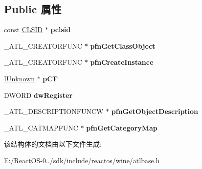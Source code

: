 \subsection*{Public 属性}
\begin{DoxyCompactItemize}
\item 
\mbox{\label{struct___a_t_l___o_b_j_m_a_p___e_n_t_r_y_w___t_a_g_adda3adce478095addcf8addf1cc44a13}} 
const \hyperlink{struct___i_i_d}{C\+L\+S\+ID} $\ast$ {\bfseries pclsid}
\item 
\mbox{\label{struct___a_t_l___o_b_j_m_a_p___e_n_t_r_y_w___t_a_g_ae605e66cee32ff31ecbcecfc16b94a3b}} 
\+\_\+\+A\+T\+L\+\_\+\+C\+R\+E\+A\+T\+O\+R\+F\+U\+NC $\ast$ {\bfseries pfn\+Get\+Class\+Object}
\item 
\mbox{\label{struct___a_t_l___o_b_j_m_a_p___e_n_t_r_y_w___t_a_g_a1512e658660d43cb823254295458a99a}} 
\+\_\+\+A\+T\+L\+\_\+\+C\+R\+E\+A\+T\+O\+R\+F\+U\+NC $\ast$ {\bfseries pfn\+Create\+Instance}
\item 
\mbox{\label{struct___a_t_l___o_b_j_m_a_p___e_n_t_r_y_w___t_a_g_a3004e0c7b805eb277e467aecdd915f16}} 
\hyperlink{interface_i_unknown}{I\+Unknown} $\ast$ {\bfseries p\+CF}
\item 
\mbox{\label{struct___a_t_l___o_b_j_m_a_p___e_n_t_r_y_w___t_a_g_afc8fbf310be7343497c9de46264fcede}} 
D\+W\+O\+RD {\bfseries dw\+Register}
\item 
\mbox{\label{struct___a_t_l___o_b_j_m_a_p___e_n_t_r_y_w___t_a_g_a39dbcde174a44d03d6dd3d8247fd3d19}} 
\+\_\+\+A\+T\+L\+\_\+\+D\+E\+S\+C\+R\+I\+P\+T\+I\+O\+N\+F\+U\+N\+CW $\ast$ {\bfseries pfn\+Get\+Object\+Description}
\item 
\mbox{\label{struct___a_t_l___o_b_j_m_a_p___e_n_t_r_y_w___t_a_g_aa0f19950e41e3199720af3f21fbc3fd1}} 
\+\_\+\+A\+T\+L\+\_\+\+C\+A\+T\+M\+A\+P\+F\+U\+NC $\ast$ {\bfseries pfn\+Get\+Category\+Map}
\end{DoxyCompactItemize}


该结构体的文档由以下文件生成\+:\begin{DoxyCompactItemize}
\item 
E\+:/\+React\+O\+S-\/0../sdk/include/reactos/wine/atlbase.\+h\end{DoxyCompactItemize}

